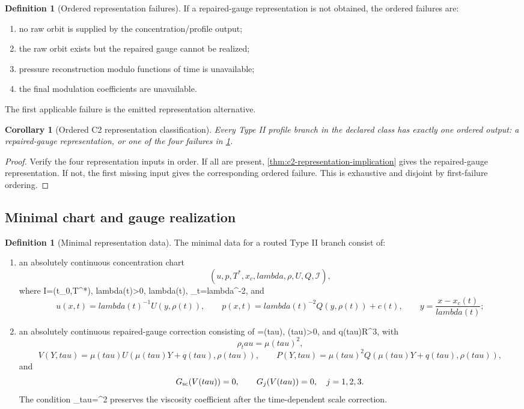 \documentclass[11pt]{amsart}
\def\({}%
\def\){}%
\def\mathbb#1{#1}%
\def\tau{tau}%
\def\lambda{lambda}%
\theoremstyle{plain}
\newtheorem{corollary}[theorem]{Corollary}
\theoremstyle{definition}
\newtheorem{definition}[theorem]{Definition}
\theoremstyle{remark}
\begin{document}
\begin{definition}[Ordered representation failures]
\label{def:c2-representation-failures}
If a repaired-gauge representation is not obtained, the ordered failures are:
\begin{enumerate}[label=\textup{(\roman*)}]
\item no raw orbit is supplied by the concentration/profile output;
\item the raw orbit exists but the repaired gauge cannot be realized;
\item pressure reconstruction modulo functions of time is unavailable;
\item the final modulation coefficients are unavailable.
\end{enumerate}
The first applicable failure is the emitted representation alternative.
\end{definition}

\begin{corollary}[Ordered C2 representation classification]
\label{cor:c2-ordered-representation}
Every Type II profile branch in the declared class has exactly one ordered
output: a repaired-gauge representation, or one of the four failures in
\cref{def:c2-representation-failures}.
\end{corollary}

\begin{proof}
Verify the four representation inputs in order.  If all are present,
\cref{thm:c2-representation-implication} gives the repaired-gauge
representation.  If not, the first missing input gives the corresponding
ordered failure.  This is exhaustive and disjoint by first-failure ordering.
\end{proof}

\subsection{Minimal chart and gauge realization}

\begin{definition}[Minimal representation data]
\label{def:c2r-minimal-representation-data}
The minimal data for a routed Type II branch consist of:
\begin{enumerate}[label=\textup{(\roman*)}]
\item an absolutely continuous concentration chart
\[
  (u,p,T^*,x_c,\lambda,\rho,U,Q,\mathcal I),
\]
where \(\mathcal I=(t_0,T^*)\), \(\lambda(t)>0\), \(\lambda(t)\),
\(\rho_t=\lambda^{-2}\), and
\[
  u(x,t)=\lambda(t)^{-1}U(y,\rho(t)),\qquad
  p(x,t)=\lambda(t)^{-2}Q(y,\rho(t))+c(t),\qquad
  y=\frac{x-x_c(t)}{\lambda(t)};
\]
\item an absolutely continuous repaired-gauge correction consisting of
\(\rho=\rho(\tau)\), \(\mu(\tau)>0\), and \(q(\tau)\in\mathbb R^3\), with
\[
  \rho_\tau=\mu(\tau)^2,
\]
\[
  V(Y,\tau)=\mu(\tau)U(\mu(\tau)Y+q(\tau),\rho(\tau)),\qquad
  P(Y,\tau)=\mu(\tau)^2Q(\mu(\tau)Y+q(\tau),\rho(\tau)),
\]
and
\[
  G_{\rm sc}(V(\tau))=0,\qquad
  G_j(V(\tau))=0,\quad j=1,2,3.
\]
The condition \(\rho_\tau=\mu^2\) preserves the viscosity coefficient after the
time-dependent scale correction.
\end{enumerate}
\end{definition}
\end{document}
